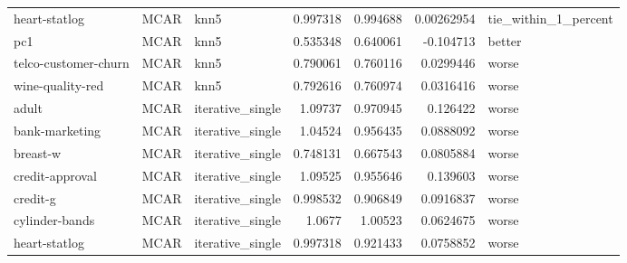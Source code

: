 \begin{table}[ht]
\begin{tabular}{lllrrrl}
 heart-statlog        & MCAR        & knn5             &                                 0.997318 &                             0.994688 &                     0.00262954 & tie\_within\_1\_percent \\
 pc1                  & MCAR        & knn5             &                                 0.535348 &                             0.640061 &                    -0.104713   & better               \\
 telco-customer-churn & MCAR        & knn5             &                                 0.790061 &                             0.760116 &                     0.0299446  & worse                \\
 wine-quality-red     & MCAR        & knn5             &                                 0.792616 &                             0.760974 &                     0.0316416  & worse                \\
 adult                & MCAR        & iterative\_single &                                 1.09737  &                             0.970945 &                     0.126422   & worse                \\
 bank-marketing       & MCAR        & iterative\_single &                                 1.04524  &                             0.956435 &                     0.0888092  & worse                \\
 breast-w             & MCAR        & iterative\_single &                                 0.748131 &                             0.667543 &                     0.0805884  & worse                \\
 credit-approval      & MCAR        & iterative\_single &                                 1.09525  &                             0.955646 &                     0.139603   & worse                \\
 credit-g             & MCAR        & iterative\_single &                                 0.998532 &                             0.906849 &                     0.0916837  & worse                \\
 cylinder-bands       & MCAR        & iterative\_single &                                 1.0677   &                             1.00523  &                     0.0624675  & worse                \\
 heart-statlog        & MCAR        & iterative\_single &                                 0.997318 &                             0.921433 &                     0.0758852  & worse                \\

\end{tabular}
\end{table}
